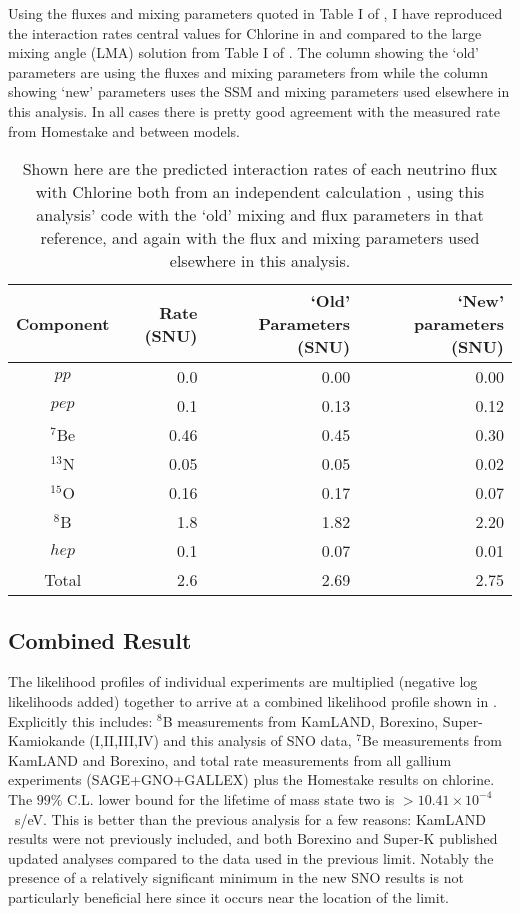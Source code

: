 Using the fluxes and mixing parameters quoted in Table I of \cite{bachall_lma}, I have reproduced the interaction rates central values for Chlorine in  and compared to the large mixing angle (LMA) solution from Table I of \cite{bachall_lma}.
The column showing the `old' parameters are using the fluxes and mixing parameters from \cite{bachall_lma} while the column showing `new' parameters uses the SSM and mixing parameters used elsewhere in this analysis.
In all cases there is pretty good agreement with the measured rate from Homestake and between models.

\begin{table}
\centering
\begin{tabular}{c|r|r|r}
Component & \cite{bachall_lma} Rate (SNU) & `Old' Parameters (SNU) & `New' parameters (SNU) \\ \hline
$pp$		& 0.0	&	0.00 & 0.00		\\
$pep$		& 0.1 	&	0.13 & 0.12		\\ 
$^7$Be		& 0.46	&	0.45 & 0.30		\\
$^{13}$N	& 0.05 	&	0.05 & 0.02		\\ 
$^{15}$O	& 0.16 	&	0.17 & 0.07		\\ 
$^8$B		& 1.8 	&	1.82 & 2.20		\\ 
$hep$		& 0.1 	&	0.07 & 0.01		\\ \hline
Total		& 2.6	&	2.69 & 2.75		\\ \hline
\end{tabular}
\caption{\label{tbl:chlorine}Shown here are the predicted interaction rates of each neutrino flux with Chlorine both from an independent calculation \cite{bachall_lma}, using this analysis' code with the `old' mixing and flux parameters in that reference, and again with the flux and mixing parameters used elsewhere in this analysis.}
\end{table}

\subsection{Combined Result}
\label{sec:combobreaker}

The likelihood profiles of individual experiments are multiplied (negative log likelihoods added) together to arrive at a combined likelihood profile shown in . 
Explicitly this includes: $^8$B measurements from KamLAND, Borexino, Super-Kamiokande (I,II,III,IV) and this analysis of SNO data, $^7$Be measurements from KamLAND and Borexino, and total rate measurements from all gallium experiments (SAGE+GNO+GALLEX) plus the Homestake results on chlorine. 
The $99\%$ C.L. lower bound for the lifetime of mass state two is $>10.41\times10^{-4}$~s/eV. 
This is better than the previous analysis for a few reasons: KamLAND results were not previously included, and both Borexino and Super-K published updated analyses compared to the data used in the previous limit. 
Notably the presence of a relatively significant minimum in the new SNO results is not particularly beneficial here since it occurs near the location of the limit.

